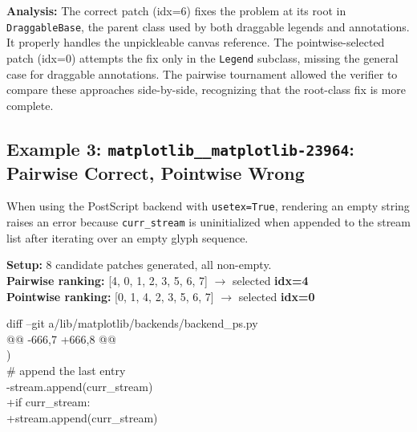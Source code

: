 \noindent\textbf{Analysis:} The correct patch (idx=6) fixes the problem at its root in \texttt{DraggableBase}, the parent class used by both draggable legends and annotations. It properly handles the unpickleable canvas reference. The pointwise-selected patch (idx=0) attempts the fix only in the \texttt{Legend} subclass, missing the general case for draggable annotations. The pairwise tournament allowed the verifier to compare these approaches side-by-side, recognizing that the root-class fix is more complete.


\subsection{Example 3: \texttt{matplotlib\_\_matplotlib-23964}: Pairwise Correct, Pointwise Wrong}

\begin{tcolorbox}[
    colback=promptbg,
    colframe=promptborder,
    title={\textbf{Issue: PostScript backend crash on empty text with usetex}},
    coltitle=white,
    fonttitle=\small\bfseries,
    breakable,
    enhanced
]
\small
When using the PostScript backend with \texttt{usetex=True}, rendering an empty string raises an error because \texttt{curr\_stream} is uninitialized when appended to the stream list after iterating over an empty glyph sequence.
\end{tcolorbox}

\noindent\textbf{Setup:} 8 candidate patches generated, all non-empty.\\
\textbf{Pairwise ranking:} [4, 0, 1, 2, 3, 5, 6, 7] \quad $\rightarrow$ selected \textbf{idx=4} \checkmark\\
\textbf{Pointwise ranking:} [0, 1, 4, 2, 3, 5, 6, 7] \quad $\rightarrow$ selected \textbf{idx=0} 

\begin{tcolorbox}[
    colback=green!5,
    colframe=green!60!black,
    title={\textbf{Pairwise-Selected Patch (idx=4): Resolves the issue \checkmark}},
    coltitle=white,
    fonttitle=\small\bfseries,
    breakable,
    enhanced
]
\small\ttfamily
diff --git a/lib/matplotlib/backends/backend\_ps.py\\
@@ -666,7 +666,8 @@\\
\quad\quad\quad\quad )\\
\quad\quad\quad \# append the last entry\\
-\quad\quad\quad stream.append(curr\_stream)\\
+\quad\quad\quad if curr\_stream:\\
+\quad\quad\quad\quad stream.append(curr\_stream)
\end{tcolorbox}

